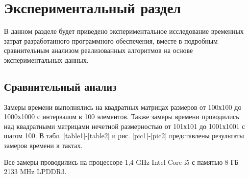 \documentclass[12pt, a4paper]{report}
\begin{document}
			
	\chapter{Экспериментальный раздел}
	
	\vspace{-0.6cm}\hspace{0.5cm}В данном разделе будет приведено экспериментальное исследование временных затрат разработанного программного обеспечения, вместе в подробным сравнительным анализом реализованных алгоритмов на основе экспериментальных данных.
	
	\section{Сравнительный анализ}
	
	\hspace{0.6cm}Замеры времени выполнялись на квадратных матрицах размеров от 100х100 до 1000х1000 с интервалом в 100 элементов. Также замеры времени проводились над квадратными матрицами нечетной размерностью  от 101х101 до 1001х1001 с шагом 100. В табл. \ref{table1}-\ref{table2} и рис. \ref{pic1}-\ref{pic2} представлены результаты замеров времени в тактах.
	
	\vspace{0.3cm}Все замеры проводились на процессоре 1,4 GHz Intel Core i5 с памятью 8 ГБ 2133 MHz LPDDR3.
	
\end{document}
